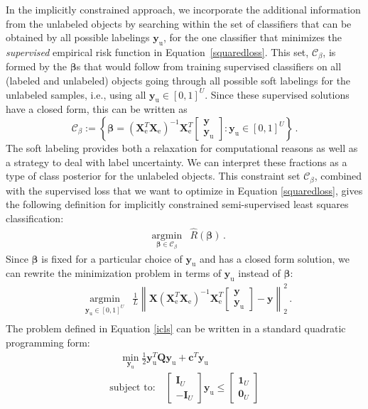 \documentclass[twoside]{memoir}\usepackage[]{graphicx}\usepackage{xcolor}
\newcommand{\Xe}{\mathbf{X}_\mathrm{e}  }
\newcommand{\XeT}{\mathbf{X}_\mathrm{e}^T}
\newcommand{\ye}{\begin{bmatrix} \mathbf{y}  \\ \mathbf{y}_\textrm{u} \end{bmatrix}}
\newcommand{\Cb}{\mathcal{C}_{\beta}}
\newcommand{\Nunl}{U}
\newcommand{\Nlab}{L}
\newcommand{\X}{\mathbf{X}}
\begin{document}
In the implicitly constrained approach, we incorporate the additional information from the unlabeled objects by searching within the set of classifiers that can be obtained by all possible labelings $\mathbf{y}_\textrm{u}$, for the one classifier that minimizes the \emph{supervised} empirical risk function in Equation~\eqref{squaredloss}. This set, $\Cb$, is formed by the $\boldsymbol{\beta}$s that would follow from training supervised classifiers on all (labeled and unlabeled) objects going through all possible soft labelings for the unlabeled samples, i.e., using all $\mathbf{y}_\textrm{u} \in [0,1]^{\Nunl}$. Since these supervised solutions have a closed form, this can be written as
\begin{equation} \label{constrainedregion}
\Cb := \left\{   \boldsymbol{\beta} = \left( {\XeT} {\Xe} \right)^{-1} {\XeT} \ye: \mathbf{y}_\textrm{u} \in [0,1]^{\Nunl} \right\} \, .
\end{equation}
The soft labeling provides both a relaxation for computational reasons as well as a strategy to deal with label uncertainty. We can interpret these fractions as a type of class posterior for the unlabeled objects. 
This constraint set $\Cb$, combined with the supervised loss that we want to optimize in Equation \eqref{squaredloss}, gives the following definition for implicitly constrained semi-supervised least squares classification:
\begin{equation}
\begin{aligned}
&\operatorname*{argmin}_{\boldsymbol{\beta} \in \Cb} & \hat{R}(\boldsymbol{\beta}) \, .
\end{aligned}
\end{equation}
Since $\boldsymbol{\beta}$ is fixed for a particular choice of $\mathbf{y}_\textrm{u}$ and has a closed form solution, we can rewrite the minimization problem in terms of $\mathbf{y}_\textrm{u}$ instead of $\boldsymbol{\beta}$:
\begin{equation} \label{icls}
\begin{aligned}
& \operatorname*{argmin}_{\mathbf{y}_\textrm{u} \in [0,1]^{\Nunl}} & \frac{1}{\Nlab}  \left\|  \X \left(\XeT \Xe \right)^{-1} \XeT \ye - \mathbf{y} \right\|_2^2 \, . \\ 
\end{aligned}
\end{equation}
The problem defined in Equation \eqref{icls} can be written in a standard quadratic programming  form:
\begin{equation}
\begin{aligned}
& \quad \min_{\mathbf{y}_\textrm{u}} \frac{1}{2} \mathbf{y}_\textrm{u}^T  \mathbf{Q}  \mathbf{y}_\textrm{u} + \mathbf{c}^T \mathbf{y}_\textrm{u}   & \\
& \text{subject to:}  \quad \begin{bmatrix} \mathbf{I}_{\Nunl}  \\ -\mathbf{I}_{\Nunl} \end{bmatrix}  \mathbf{y}_\textrm{u} \leq \begin{bmatrix} \mathbf{1}_{\Nunl}  \\ \mathbf{0}_{\Nunl} \end{bmatrix} & \\
\end{aligned}
\end{equation}
\end{document}

